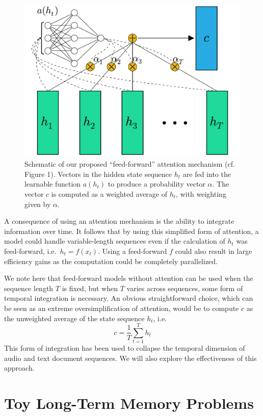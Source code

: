 \documentclass{article} %
\begin{document}
\begin{figure}
  \centering
  \includegraphics[width=.8\textwidth]{schematic.pdf}
  \caption{Schematic of our proposed ``feed-forward'' attention mechanism (cf.\ \citep{cho2015introduction} Figure 1).  Vectors in the hidden state sequence $h_t$ are fed into the learnable function $a(h_t)$ to produce a probability vector $\alpha$.  The vector $c$ is computed as a weighted average of $h_t$, with weighting given by $\alpha$.}
  \label{fig:schematic}
\end{figure}

A consequence of using an attention mechanism is the ability to integrate information over time.
It follows that by using this simplified form of attention, a model could handle variable-length sequences even if the calculation of $h_t$ was feed-forward, i.e.\ $h_t = f(x_t)$.
Using a feed-forward $f$ could also result in large efficiency gains as the computation could be completely parallelized.

We note here that feed-forward models without attention can be used when the sequence length $T$ is fixed, but when $T$ varies across sequences, some form of temporal integration is necessary.
An obvious straightforward choice, which can be seen as an extreme oversimplification of attention, would be to compute $c$ as the unweighted average of the state sequence $h_t$, i.e.
\begin{equation}
\label{eq:unweighted}
c = \frac{1}{T}\sum_{t = 1}^T h_t
\end{equation}
This form of integration has been used to collapse the temporal dimension of audio \citep{dieleman2014recommending} and text document \citep{lei2015molding} sequences.
We will also explore the effectiveness of this approach.

\section{Toy Long-Term Memory Problems}
\end{document}

